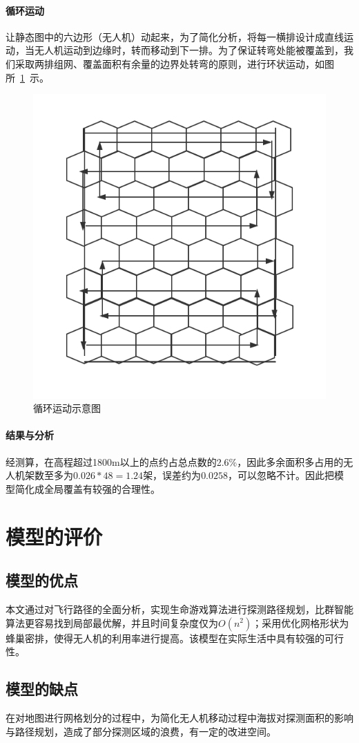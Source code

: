 \documentclass{whutmod}
\begin{document}
\paragraph{循环运动}
让静态图中的六边形（无人机）动起来，为了简化分析，将每一横排设计成直线运动，当无人机运动到边缘时，转而移动到下一排。为了保证转弯处能被覆盖到，我们采取两排组网、覆盖面积有余量的边界处转弯的原则，进行环状运动，如图所~\ref{jjj}~示。
			\begin{figure}[H]
	\centering
	\includegraphics[width=.5\textwidth]{figures/jjj.png}
	\caption{循环运动示意图}\label{jjj}
\end{figure}

\paragraph{结果与分析}
经测算，在高程超过1800m以上的点约占总点数的2.6\%，因此多余面积多占用的无人机架数至多为$0.026*48=1.24$架，误差约为$0.0258$，可以忽略不计。因此把模型简化成全局覆盖有较强的合理性。
	\section{模型的评价}
	\subsection{模型的优点}
	本文通过对飞行路径的全面分析，实现生命游戏算法进行探测路径规划，比群智能算法更容易找到局部最优解，并且时间复杂度仅为$O(n^{2})$；采用优化网格形状为蜂巢密排，使得无人机的利用率进行提高。该模型在实际生活中具有较强的可行性。
	
	\subsection{模型的缺点}
	在对地图进行网格划分的过程中，为简化无人机移动过程中海拔对探测面积的影响与路径规划，造成了部分探测区域的浪费，有一定的改进空间。
	
\end{document}

